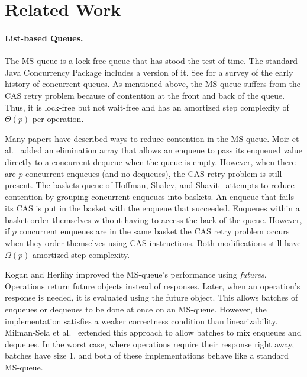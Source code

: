 
\section{Related Work}

\paragraph{List-based Queues.}
The MS-queue \cite{MS98} is a lock-free queue that has stood the test of time.
The standard Java Concurrency Package includes a version of it.  %
See \cite{MS98} for a survey of the early history of concurrent queues.
As mentioned above, the MS-queue suffers from the CAS retry problem because of contention at the front and back of the queue.
Thus, it is lock-free but not wait-free and has an amortized step complexity of $\Theta(p)$ per operation.

Many papers have described ways to reduce contention in the MS-queue.
Moir et al.~\cite{DBLP:conf/spaa/MoirNSS05} 
added an elimination array that allows an enqueue to pass its enqueued value directly
to a concurrent dequeue when the queue is empty.
However, when there are $p$ concurrent enqueues (and no dequeues), the CAS retry problem
is still present.
The baskets queue of
Hoffman, Shalev, and Shavit~\cite{DBLP:conf/opodis/HoffmanSS07} 
attempts to reduce contention by grouping concurrent enqueues into baskets.
An enqueue that fails its CAS is put in the basket with the enqueue that succeeded.
Enqueues within a basket order  themselves without having to access the back of the queue.
However, if $p$ concurrent enqueues are in the same basket
the CAS retry problem occurs when they order themselves using CAS instructions.
Both modifications still have $\Omega(p)$ amortized step complexity.

Kogan and Herlihy \cite{DBLP:conf/podc/KoganH14} improved the MS-queue's performance using \emph{futures}.
Operations return future
objects instead of responses. Later, when an operation's response is needed, it
is evaluated using the future object.
This allows batches of enqueues or dequeues to be done at once on an MS-queue.
However, the implementation satisfies a weaker correctness condition than linearizability.
Milman-Sela et al.~\cite{MKLLP22} extended this approach to allow batches
to mix enqueues and dequeues.
In the worst case, where operations require their response right away,
batches have size 1, and both of these implementations behave like a standard MS-queue.


